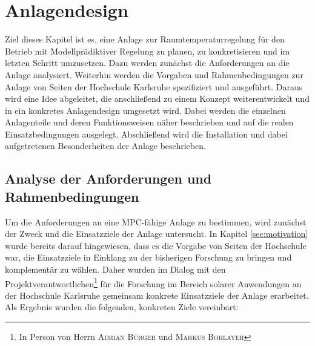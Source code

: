 %
%

\renewcommand{\chapterheadstartvskip}{\vspace*{2cm}}

\chapter{Anlagendesign}
\label{chap:anlagendesign}

\renewcommand{\chapterheadstartvskip}{\vspace*{-0.5cm}}

Ziel dieses Kapitel ist es, eine Anlage zur Raumtemperaturregelung für den Betrieb mit Modellprädiktiver Regelung zu planen, zu konkretisieren und im letzten Schritt umzusetzen. Dazu werden zunächst die Anforderungen an die Anlage analysiert. Weiterhin werden die Vorgaben und Rahmenbedingungen zur Anlage von Seiten der Hochschule Karlsruhe spezifiziert und ausgeführt. Daraus wird eine Idee abgeleitet, die anschließend zu einem Konzept weiterentwickelt und in ein konkretes Anlagendesign umgesetzt wird. Dabei werden die einzelnen Anlagenteile und deren Funktionsweisen näher beschrieben und auf die realen Einsatzbedingungen ausgelegt. Abschließend wird die Installation und dabei aufgetretenen Besonderheiten der Anlage beschrieben.

\section{Analyse der Anforderungen und Rahmenbedingungen}
\label{sec:anforderungen}

Um die Anforderungen an eine MPC-fähige Anlage zu bestimmen, wird zunächst der Zweck und die Einsatzziele der Anlage untersucht. In Kapitel \ref{sec:motivation} wurde bereits darauf hingewiesen, dass es die Vorgabe von Seiten der Hochschule war, die Einsatzziele in Einklang zu der bisherigen Forschung zu bringen und komplementär zu wählen. Daher wurden im Dialog mit den Projektverantwortlichen\footnote{In Person von Herrn \textsc{Adrian Bürger} und \textsc{Markus Bohlayer}} für die Forschung im Bereich solarer Anwendungen an der Hochschule Karlsruhe gemeinsam konkrete Einsatzziele der Anlage erarbeitet. Als Ergebnis wurden die folgenden, konkreten Ziele vereinbart:
 
